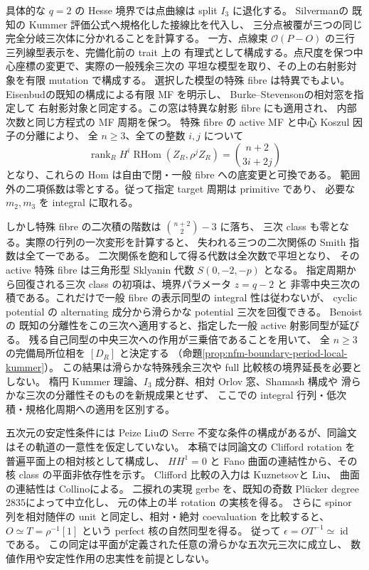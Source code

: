 具体的な $q=2$ の Hesse 境界では点曲線は split $I_3$ に退化する。
Silverman\cite[Chapter~XI, Proposition~9.2]{NFMSilvermanArithmetic}の
既知の Kummer 評価公式へ規格化した接線比を代入し、
三分点被覆が三つの同じ完全分岐三次体に分かれることを計算する。
一方、点線束 $\mathcal O(P-O)$ の三行三列線型表示を、完備化前の trait 上の
有理式として構成する。点尺度を保つ中心座標の変更で、実際の一般残余三次の
平坦な模型を取り、その上の右射影対象を有限 mutation で構成する。
選択した模型の特殊 fibre は特異でもよい。
Eisenbud\cite[Theorem~7.2]{NFMEisenbudCI}の既知の構成による有限 MF を明示し、
Burke--Stevenson\cite[Theorem~6.4(1)]{NFMBurkeStevenson}の相対窓を指定して
右射影対象と同定する。この窓は特異な射影 fibre にも適用され、
内部次数と同じ方程式の MF 周期を保つ。
特殊 fibre の active MF と中心 Koszul 因子の分離により、
全 $n\ge3$、全ての整数 $i,j$ について
\[
 \operatorname{rank}_R H^i\operatorname{RHom}(Z_R,\rho^jZ_R)
 =\binom{n+2}{3i+2j}
\]
となり、これらの Hom は自由で閉・一般 fibre への底変更と可換である。
範囲外の二項係数は零とする。従って指定 target 周期は primitive であり、
必要な $m_2,m_3$ を integral に取れる。

しかし特殊 fibre の二次積の階数は $\binom{n+2}{2}-3$ に落ち、
三次 class も零となる。実際の行列の一次変形を計算すると、
失われる三つの二次関係の Smith 指数は全て一である。
二次関係を飽和して得る代数は全次数で平坦となり、
その active 特殊 fibre は三角形型 Sklyanin 代数 $S(0,-2,-p)$ となる。
指定周期から回復される三次 class の初項は、境界パラメータ $z=q-2$ と
非零中央三次の積である。これだけで一般 fibre の表示同型の integral 性は従わないが、
cyclic potential の alternating 成分から滑らかな potential 三次を回復できる。
Benoist\cite[Theorems~1.6(ii), 1.7, Lemma~2.2(iii)]{NFMBenoistSeparation}の
既知の分離性をこの三次へ適用すると、指定した一般 active 射影同型が延びる。
残る自己同型の中央三次への作用が三乗倍であることを用いて、
全 $n\ge3$ の完備局所位相を $[D_R]$ と決定する
（命題\ref{prop:nfm-boundary-period-local-kummer}）。
この結果は滑らかな特殊残余三次や full 比較核の境界延長を必要としない。
楕円 Kummer 理論、$I_3$ 成分群、相対 Orlov 窓、Shamash 構成や
滑らかな三次の分離性そのものを新規成果とせず、
ここでの integral 行列・低次積・規格化周期への適用を区別する。

五次元の安定性条件には Peize Liu\cite[Theorem~1.1, Remark~5.6]{NFMPeizeLiuFivefold}の
Serre 不変な条件の構成があるが、同論文はその軌道の一意性を仮定していない。
本稿では同論文の Clifford rotation を普遍平面上の相対核として構成し、
$HH^1=0$ と Fano 曲面の連結性から、その核 class の平面非依存性を示す。
Clifford 比較の入力は Kuznetsov\cite[Theorem~4.2]{NFMKuznetsovQuadric}と
Liu\cite[Theorem~2.8, Corollary~3.10]{NFMPeizeLiuFivefold}、
曲面の連結性は Collino\cite[Propositions~1.8, 1.10]{NFMCollinoFivefold}による。
二捩れの実現 gerbe を、既知の奇数 Pl\"ucker degree
$2835$\cite[Example~4.4]{NFMCilibertoZaidenbergFano}によって中立化し、
元の体上の半 rotation の実核を得る。
さらに spinor 列を相対随伴の unit と同定し、相対・絶対 coevaluation を比較すると、
$O\simeq T=\rho^{-1}[1]$ という perfect 核の自然同型を得る。
従って $\epsilon=OT^{-1}\simeq\operatorname{id}$ である。
この同定は平面が定義された任意の滑らかな五次元三次に成立し、
数値作用や安定性作用の忠実性を前提としない。

